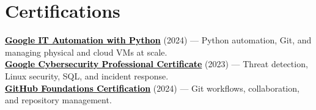 \documentclass[a4paper]{article}
\begin{document}
\section{Certifications}
 \begin{itemize}[leftmargin=0.15in, label={}]
    \small{\item{
    \href{https://coursera.org/share/2afadc6ce043cc25337eb8c8fe61c9b6}{\textcolor{black}{\textbf{Google IT Automation with Python}}} (2024) --- Python automation, Git, and managing physical and cloud VMs at scale. \\
    \href{https://coursera.org/share/44fd8f381cb39ac45892569cdf6f7674}{\textcolor{black}{\textbf{Google Cybersecurity Professional Certificate}}} (2023) --- Threat detection, Linux security, SQL, and incident response. \\
    \href{https://www.credly.com/badges/d5c30c19-02db-4c5f-9bc9-4bd0f4b6a89e/public_url}{\textcolor{black}{\textbf{GitHub Foundations Certification}}} (2024) --- Git workflows, collaboration, and repository management.
    }}
 \end{itemize}


\end{document}
